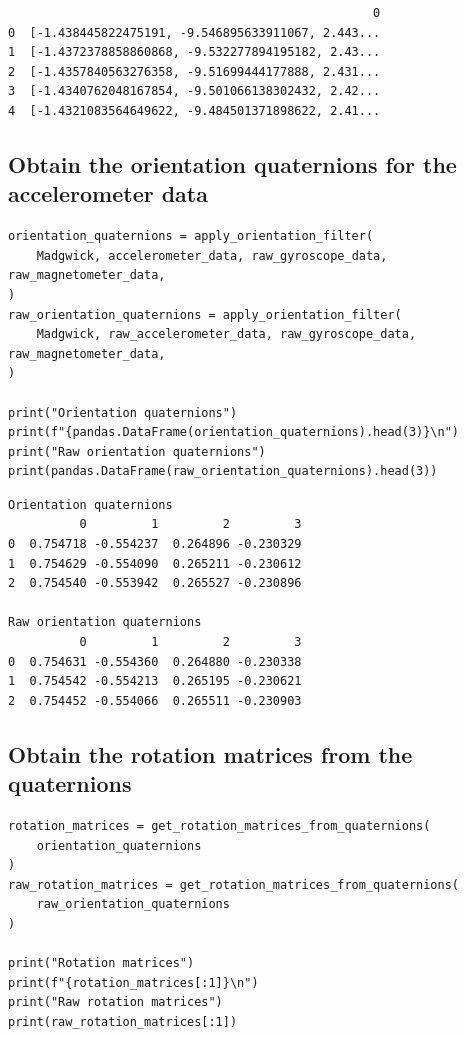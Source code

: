 \documentclass[12pt]{report}
\begin{document}
\label{org893d76a}
\begin{verbatim}
                                                   0
0  [-1.438445822475191, -9.546895633911067, 2.443...
1  [-1.4372378858860868, -9.532277894195182, 2.43...
2  [-1.4357840563276358, -9.51699444177888, 2.431...
3  [-1.4340762048167854, -9.501066138302432, 2.42...
4  [-1.4321083564649622, -9.484501371898622, 2.41...
\end{verbatim}
\subsection{Obtain the orientation quaternions for the accelerometer data}
\label{sec:org646e482}
\begin{verbatim}
orientation_quaternions = apply_orientation_filter(
    Madgwick, accelerometer_data, raw_gyroscope_data, raw_magnetometer_data,
)
raw_orientation_quaternions = apply_orientation_filter(
    Madgwick, raw_accelerometer_data, raw_gyroscope_data, raw_magnetometer_data,
)

print("Orientation quaternions")
print(f"{pandas.DataFrame(orientation_quaternions).head(3)}\n")
print("Raw orientation quaternions")
print(pandas.DataFrame(raw_orientation_quaternions).head(3))
\end{verbatim}

\label{org9de957f}
\begin{verbatim}
Orientation quaternions
          0         1         2         3
0  0.754718 -0.554237  0.264896 -0.230329
1  0.754629 -0.554090  0.265211 -0.230612
2  0.754540 -0.553942  0.265527 -0.230896

Raw orientation quaternions
          0         1         2         3
0  0.754631 -0.554360  0.264880 -0.230338
1  0.754542 -0.554213  0.265195 -0.230621
2  0.754452 -0.554066  0.265511 -0.230903
\end{verbatim}
\subsection{Obtain the rotation matrices from the quaternions}
\label{sec:org5998142}
\begin{verbatim}
rotation_matrices = get_rotation_matrices_from_quaternions(
    orientation_quaternions
)
raw_rotation_matrices = get_rotation_matrices_from_quaternions(
    raw_orientation_quaternions
)

print("Rotation matrices")
print(f"{rotation_matrices[:1]}\n")
print("Raw rotation matrices")
print(raw_rotation_matrices[:1])
\end{verbatim}
\end{document}
